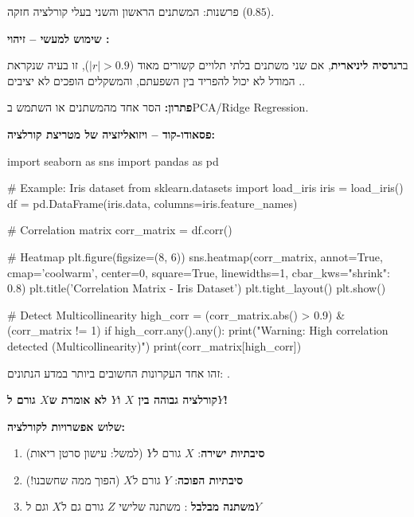 פרשנות: המשתנים הראשון והשני בעלי קורלציה חזקה ($0.85$).

\textbf{שימוש למעשי – זיהוי :}

ב\textbf{רגרסיה ליניארית}, אם שני משתנים בלתי תלויים קשורים מאוד ($|r| > 0.9$), זו בעיה שנקראת \textbf{}. המודל לא יכול להפריד בין השפעתם, והמשקלים הופכים לא יציבים.

\textbf{פתרון:} הסר אחד מהמשתנים או השתמש ב\en{-}PCA/Ridge Regression.

\textbf{פסאודו-קוד – ויזואליזציה של מטריצת קורלציה:}

\begin{pythonbox}
import seaborn as sns
import pandas as pd

# Example: Iris dataset
from sklearn.datasets import load_iris
iris = load_iris()
df = pd.DataFrame(iris.data, columns=iris.feature_names)

# Correlation matrix
corr_matrix = df.corr()

# Heatmap
plt.figure(figsize=(8, 6))
sns.heatmap(corr_matrix, annot=True, cmap='coolwarm', center=0,
            square=True, linewidths=1, cbar_kws={"shrink": 0.8})
plt.title('Correlation Matrix - Iris Dataset')
plt.tight_layout()
plt.show()

# Detect Multicollinearity
high_corr = (corr_matrix.abs() > 0.9) & (corr_matrix != 1)
if high_corr.any().any():
    print("Warning: High correlation detected (Multicollinearity)")
    print(corr_matrix[high_corr])
\end{pythonbox}


זהו אחד העקרונות החשובים ביותר במדע הנתונים: \textbf{}.

\textbf{קורלציה גבוהה בין $X$ ו\en{-}$Y$ לא אומרת ש\en{-}$X$ גורם ל\en{-}$Y$!}

\textbf{שלוש אפשרויות לקורלציה:}

\begin{enumerate}
\item \textbf{סיבתיות ישירה}: $X$ גורם ל\en{-}$Y$ (למשל: עישון \rarrow{} סרטן ריאות)
\item \textbf{סיבתיות הפוכה}: $Y$ גורם ל\en{-}$X$ (הפוך ממה שחשבנו!)
\item \textbf{משתנה מבלבל} : משתנה שלישי $Z$ גורם גם ל\en{-}$X$ וגם ל\en{-}$Y$
\end{enumerate}

